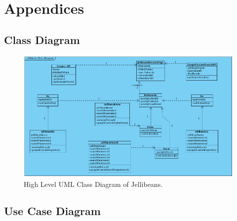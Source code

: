 \documentclass[a4paper, 11pt]{article}
\begin{document}
\newpage
\section {Appendices}

\newpage
\subsection{Class Diagram}\label{jBeanClassDiagram}
\begin{figure}[H]
\begin{center}
\includegraphics[scale=0.55]{jBeanClassDiagram}
\caption{High Level UML Class Diagram of Jellibeans.}
\end{center}
\end{figure}

\newpage
\subsection{Use Case Diagram}\label{JBeanUseCaseA}
\end{document}
